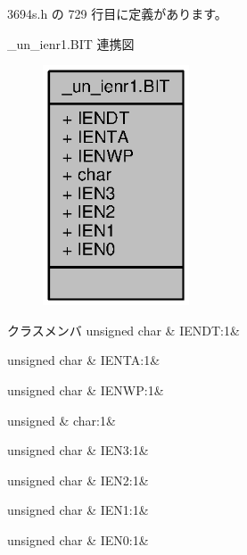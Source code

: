  3694s.\+h の 729 行目に定義があります。



\+\_\+un\+\_\+ienr1.\+B\+I\+T 連携図
\nopagebreak
\begin{figure}[H]
\begin{center}
\leavevmode
\includegraphics[width=123pt]{dc/df0/struct__un__ienr1_8BIT__coll__graph}
\end{center}
\end{figure}
\begin{DoxyFields}{クラスメンバ}
unsigned char\label{3694s_8h_a3e9636ce3050f03822099e657b59869f}
&
I\+E\+N\+D\+T\+:1&
\\
\hline

unsigned char\label{3694s_8h_a3edcefe8a731f8be455224d5b32fa19b}
&
I\+E\+N\+T\+A\+:1&
\\
\hline

unsigned char\label{3694s_8h_a378dc7e5acb520d09c8242fdbcf4fe0c}
&
I\+E\+N\+W\+P\+:1&
\\
\hline

unsigned\label{3694s_8h_aa87deb01c5f539e6bda34829c8ef2368}
&
char\+:1&
\\
\hline

unsigned char\label{3694s_8h_a1c0b9561df1910e7ade9e14e49d1bf61}
&
I\+E\+N3\+:1&
\\
\hline

unsigned char\label{3694s_8h_a2a444adedd8dd2f1737bc9880138f6cb}
&
I\+E\+N2\+:1&
\\
\hline

unsigned char\label{3694s_8h_a36c80503f58688ba41c0e41938118ba4}
&
I\+E\+N1\+:1&
\\
\hline

unsigned char\label{3694s_8h_a040b95dfc053e31c9ca4a074ebd1a2e1}
&
I\+E\+N0\+:1&
\\
\hline

\end{DoxyFields}
\label{struct__un__irr1_8BIT}
